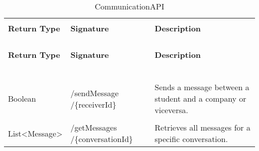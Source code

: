\begin{longtable}{p{}p{}p{}}
    \caption{CommunicationAPI}
    \vspace{0.5em}\\
    \hline
    \vspace{0.5em}\\
    \textbf{Return Type} & \textbf{Signature} & \textbf{Description} \\
    \vspace{0.5em}\\
    \hline
    \vspace{0.5em}\\
    \endfirsthead
    \vspace{0.5em}\\
    \hline
    \vspace{0.5em}\\
    \textbf{Return Type} & \textbf{Signature} & \textbf{Description} \\
    \vspace{0.5em}\\
    \hline
    \vspace{0.5em}\\
    \endhead
    
    \vspace{0.5em}\\
    \hline
    \vspace{0.5em}\\
    \endfoot
    
    \vspace{0.5em}\\
    \hline
    \vspace{0.5em}\\
    \endlastfoot
    
    Boolean &
    /sendMessage /\{receiverId\} &
    Sends a message between a student and a company or viceversa. \\
    \vspace{0.5em}\\
    List<Message> &
    /getMessages /\{conversationId\} &
    Retrieves all messages for a specific conversation. \\

\end{longtable}

